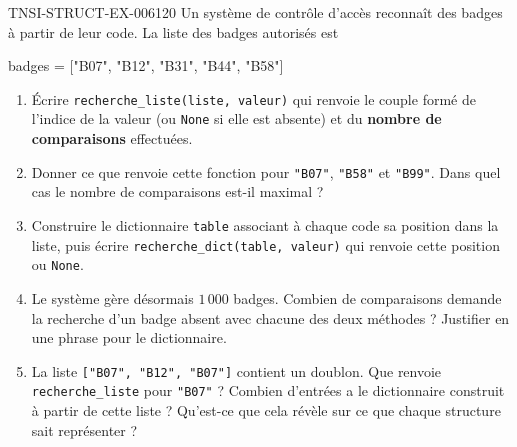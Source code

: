 \begin{exercice}{TNSI-STRUCT-EX-006}{1}{20}
Un système de contrôle d'accès reconnaît des badges à partir de leur code. La
liste des badges autorisés est
\begin{python}
badges = ["B07", "B12", "B31", "B44", "B58"]
\end{python}
\begin{enumerate}
  \item Écrire \lstinline{recherche_liste(liste, valeur)} qui renvoie le couple
    formé de l'indice de la valeur (ou \lstinline{None} si elle est absente) et
    du \textbf{nombre de comparaisons} effectuées.
  \item Donner ce que renvoie cette fonction pour \lstinline{"B07"},
    \lstinline{"B58"} et \lstinline{"B99"}. Dans quel cas le nombre de
    comparaisons est-il maximal ?
  \item Construire le dictionnaire \lstinline{table} associant à chaque code sa
    position dans la liste, puis écrire \lstinline{recherche_dict(table, valeur)}
    qui renvoie cette position ou \lstinline{None}.
  \item Le système gère désormais $1\,000$ badges. Combien de comparaisons
    demande la recherche d'un badge absent avec chacune des deux méthodes ?
    Justifier en une phrase pour le dictionnaire.
  \item La liste \lstinline{["B07", "B12", "B07"]} contient un doublon. Que
    renvoie \lstinline{recherche_liste} pour \lstinline{"B07"} ? Combien
    d'entrées a le dictionnaire construit à partir de cette liste ? Qu'est-ce
    que cela révèle sur ce que chaque structure sait représenter ?
\end{enumerate}
\end{exercice}
